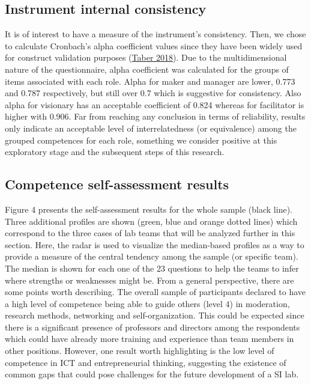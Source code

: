 \documentclass[AMA,STIX1COL,APA,STIX2COL]{WileyNJD-v2}
\begin{document}
\hypertarget{instrument-internal-consistency}{%
\subsection{Instrument internal
consistency}\label{instrument-internal-consistency}}

It is of interest to have a measure of the instrument's consistency.
Then, we chose to calculate Cronbach's alpha coefficient values since
they have been widely used for construct validation purposes
(\protect\hyperlink{ref-Taber2018}{Taber 2018}). Due to the
multidimensional nature of the questionnaire, alpha coefficient was
calculated for the groups of items associated with each role. Alpha for
maker and manager are lower, 0.773 and 0.787 respectively, but still
over 0.7 which is suggestive for consistency. Also alpha for visionary
has an acceptable coefficient of 0.824 whereas for facilitator is higher
with 0.906. Far from reaching any conclusion in terms of reliability,
results only indicate an acceptable level of interrelatedness (or
equivalence) among the grouped competences for each role, something we
consider positive at this exploratory stage and the subsequent steps of
this research.

\hypertarget{competence-self-assessment-results}{%
\subsection{Competence self-assessment
results}\label{competence-self-assessment-results}}

Figure 4 presents the self-assessment results for the whole sample
(black line). Three additional profiles are shown (green, blue and
orange dotted lines) which correspond to the three cases of lab teams
that will be analyzed further in this section. Here, the radar is used
to visualize the median-based profiles as a way to provide a measure of
the central tendency among the sample (or specific team). The median is
shown for each one of the 23 questions to help the teams to infer where
strengths or weaknesses might be. From a general perspective, there are
some points worth describing. The overall sample of participants
declared to have a high level of competence being able to guide others
(level 4) in moderation, research methods, networking and
self-organization. This could be expected since there is a significant
presence of professors and directors among the respondents which could
have already more training and experience than team members in other
positions. However, one result worth highlighting is the low level of
competence in ICT and entrepreneurial thinking, suggesting the existence
of common gaps that could pose challenges for the future development of
a SI lab.
\end{document}
